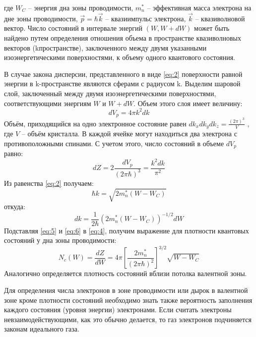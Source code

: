 где $W_C$ – энергия дна зоны проводимости, $m_n^*$ –  эффективная масса электрона на дне зоны проводимости, $\vec{p} =
\hbar \vec{k}$ – квазиимпульс электрона, $\vec{k}$ – квазиволновой вектор. Число состояний в интервале энергий $(W, W+dW)$ может быть найдено
путем определения отношения объема в пространстве квазиволновых векторов (kпространстве), заключенного между двумя
указанными изоэнергетическими поверхностями, к объему одного квантового состояния. 

В случае закона дисперсии, представленного в виде \eqref{eq:2} поверхности равной энергии в k-пространстве являются
сферами с радиусом k. Выделим шаровой слой, заключенный между двумя изоэнергетическими поверхностями, соответствующими
энергиям $W$ и $W+dW$. Объем этого слоя имеет величину: 
\begin{equation}
	dV_p = 4 \pi k^2 d k
	\label{eq:3}
\end{equation}
Объём, приходящийся на одно электронное состояние равен $dk_x dk_y dk_z = \frac{(2 \pi)^3}{V}$ , где $V$ – объём
кристалла. В каждой ячейке могут находиться два электрона с противоположными спинами. С учетом этого, число состояний в
объеме $dV_p$ равно: 
\begin{equation}
	d Z=2 \frac{d V_{p}}{(2 \pi \hbar)^{3}}=\frac{k^{2} d k}{\pi^{2}}
	\label{eq:4}
\end{equation}
Из равенства \eqref{eq:2} получаем: 
\begin{equation}
	\hbar k=\sqrt{2 m_{n}^{*}\left(W-W_{C}\right)}
	\label{eq:5}
\end{equation}
откуда:
\begin{equation}
	d k=\frac{1}{2 \hbar}\left(2 m_{n}^{*}\left(W-W_{C}\right)\right)^{-1 / 2} d W
	\label{eq:6}
\end{equation}
Подставляя \eqref{eq:5} и \eqref{eq:6} в \eqref{eq:4}, получим выражение для плотности квантовых состояний у дна зоны
проводимости:
\begin{equation}
	N_{c}(W)=\frac{d Z}{d W}=4 \pi\left[\frac{2 m_{n}^{*}}{(2 \pi \hbar)^{2}}\right]^{3 / 2} \sqrt{W-W_{C}}
	\label{eq:7}
\end{equation} 
Аналогично определяется плотность состояний вблизи потолка валентной зоны.

Для определения числа электронов в зоне проводимости или дырок в валентной зоне кроме плотности состояний необходимо
знать также вероятность заполнения каждого состояния (уровня энергии) электронами. Если считать электроны
невзаимодействующими, как это обычно делается, то газ электронов подчиняется законам идеального газа. 

